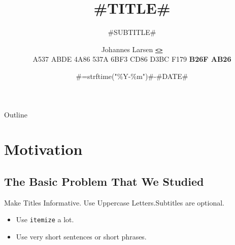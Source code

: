 \documentclass{beamer}
\title%
{#TITLE#}
\subtitle{#SUBTITLE#}
\author%
{
	Johannes Larsen \href{mailto:\authormail}{\texttt{<\authormail>}}\\
	{\scriptsize A537 ABDE 4A86 537A 6BF3  CD86 D3BC F179 \textbf{B26F AB26}}
}
\institute[UiT]
{
	Department of Computer Science\\
	UiT The Arctic University of Norway
}
\date%
{#=strftime("\%Y-\%m")#-#DATE#} %
\begin{document}
\begin{frame}
	\titlepage
\end{frame}

\begin{frame}{Outline}
	\tableofcontents%
\end{frame}




\section{Motivation}

\subsection{The Basic Problem That We Studied}

\begin{frame}{Make Titles Informative. Use Uppercase Letters.}{Subtitles are optional.}

	\begin{itemize}
	\item
		Use \texttt{itemize} a lot.
	\item
		Use very short sentences or short phrases.
	\end{itemize}
\end{frame}
\end{document}
